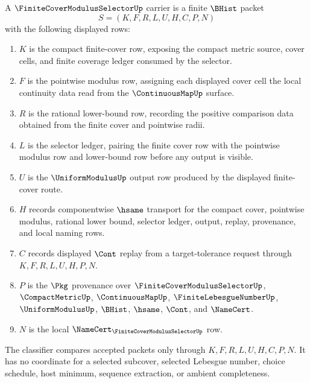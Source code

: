 \begin{definition}
\label{def:finite-cover-modulus-selector-carrier}
A $\FiniteCoverModulusSelectorUp$ carrier is a finite $\BHist$ packet
$$
S=(K,F,R,L,U,H,C,P,N)
$$
with the following displayed rows:
\begin{enumerate}
\item $K$ is the compact finite-cover row, exposing the compact metric source, cover cells, and finite coverage ledger consumed by the selector.
\item $F$ is the pointwise modulus row, assigning each displayed cover cell the local continuity data read from the $\ContinuousMapUp$ surface.
\item $R$ is the rational lower-bound row, recording the positive comparison data obtained from the finite cover and pointwise radii.
\item $L$ is the selector ledger, pairing the finite cover row with the pointwise modulus row and lower-bound row before any output is visible.
\item $U$ is the $\UniformModulusUp$ output row produced by the displayed finite-cover route.
\item $H$ records componentwise $\hsame$ transport for the compact cover, pointwise modulus, rational lower bound, selector ledger, output, replay, provenance, and local naming rows.
\item $C$ records displayed $\Cont$ replay from a target-tolerance request through $K,F,R,L,U,H,P,N$.
\item $P$ is the $\Pkg$ provenance over $\FiniteCoverModulusSelectorUp$, $\CompactMetricUp$, $\ContinuousMapUp$, $\FiniteLebesgueNumberUp$, $\UniformModulusUp$, $\BHist$, $\hsame$, $\Cont$, and $\NameCert$.
\item $N$ is the local $\NameCert_{\FiniteCoverModulusSelectorUp}$ row.
\end{enumerate}
The classifier compares accepted packets only through $K,F,R,L,U,H,C,P,N$. It has no coordinate for a selected subcover, selected Lebesgue number, choice schedule, host minimum, sequence extraction, or ambient completeness.
\end{definition}

